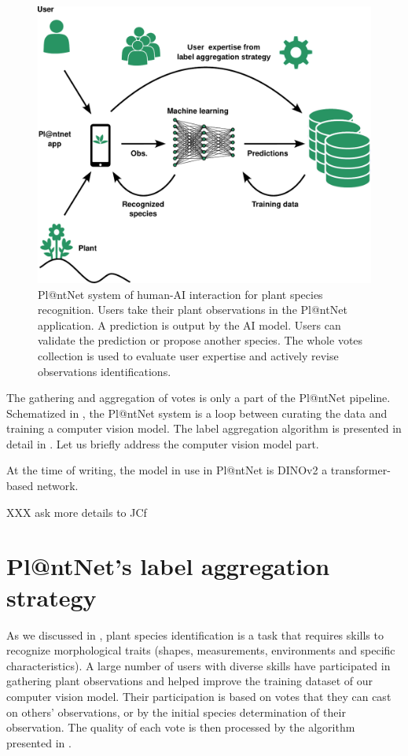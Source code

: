 \begin{figure}[thb]
        \centering
        \includegraphics[width=.65\linewidth]{images/plantnet_schema_global_green.pdf}
        \caption{Pl@ntNet system of human-AI interaction for plant species recognition. Users take their plant observations in the Pl@ntNet application. A prediction is output by the AI model. Users can validate the prediction or propose another species. The whole votes collection is used to evaluate user expertise and actively revise observations identifications.}
        \label{fig:plantnet-system}
    \end{figure}

The gathering and aggregation of votes is only a part of the Pl@ntNet pipeline.
Schematized in , the Pl@ntNet system is a loop between curating the data and training a computer vision model.
The label aggregation algorithm is presented in detail in .
Let us briefly address the computer vision model part.

At the time of writing, the model in use in Pl@ntNet is DINOv2 \citep{oquab2024dinov2} a transformer-based network.

XXX ask more details to JCf


\section{Pl@ntNet's label aggregation strategy}
\label{sec:aggregation_plantnet}

As we discussed in , plant species identification is a task that requires skills to recognize morphological traits (shapes, measurements, environments and specific characteristics).
A large number of users with diverse skills have participated in gathering plant observations and helped improve the training dataset of our computer vision model.
Their participation is based on votes that they can cast on others' observations, or by the initial species determination of their observation.
The quality of each vote is then processed by the algorithm presented in .

